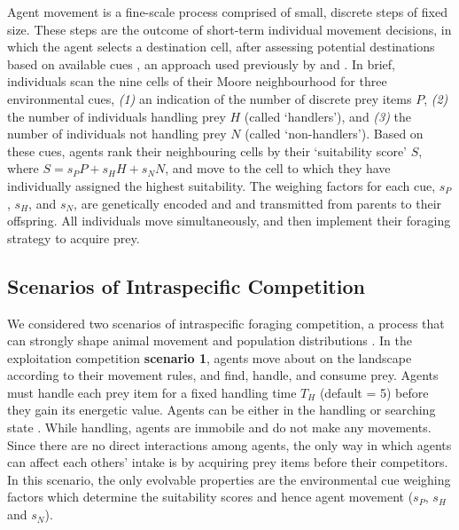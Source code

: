     Agent movement is a fine-scale process comprised of small, discrete steps of fixed size.
    These steps are the outcome of short-term individual movement decisions, in which the agent selects a destination cell, after assessing potential destinations based on available cues \citep[similar to step selection or resource selection][]{fortin2005,manly2007}, an approach used previously by \cite{getz2015} and \cite{white2018}.
    In brief, individuals scan the nine cells of their Moore neighbourhood for three environmental cues, \textit{(1)} an indication of the number of discrete prey items $P$, \textit{(2)} the number of individuals handling prey $H$ (called `handlers'), and \textit{(3)} the number of individuals not handling prey $N$ (called `non-handlers').
    Based on these cues, agents rank their neighbouring cells by their `suitability score' $S$, where $S = s_PP + s_HH + s_NN$, and move to the cell to which they have individually assigned the highest suitability.
    The weighing factors for each cue, $s_P$, $s_H$, and $s_N$, are genetically encoded and and transmitted from parents to their offspring.
    All individuals move simultaneously, and then implement their foraging strategy to acquire prey.
    
    \subsection*{Scenarios of Intraspecific Competition}
    
    We considered two scenarios of intraspecific foraging competition, a process that can strongly shape animal movement and population distributions \citep{fretwell1970,parker1978}.
    In the exploitation competition \textbf{scenario 1}, agents move about on the landscape according to their movement rules, and find, handle, and consume prey.
    Agents must handle each prey item for a fixed handling time $T_H$ (default = 5) before they gain its energetic value.
    Agents can be either in the handling or searching state \citep{holmgren1995}.
    While handling, agents are immobile and do not make any movements.
    Since there are no direct interactions among agents, the only way in which agents can affect each others' intake is by acquiring prey items before their competitors.
    In this scenario, the only evolvable properties are the environmental cue weighing factors which determine the suitability scores and hence agent movement ($s_P$, $s_H$ and $s_N$).
    
